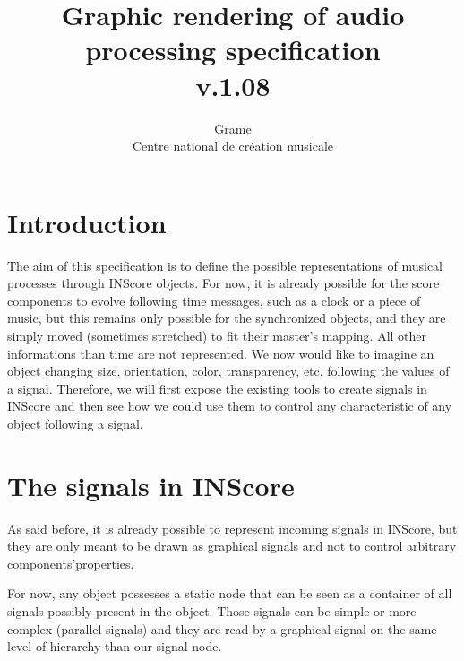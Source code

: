 \documentclass[a4paper]{article}
\begin{document}
\title{Graphic rendering of audio processing specification \\ v.1.08}

\author{Grame \\ Centre national de cr\'eation musicale}

\maketitle

\section*{Introduction}\label{sec:intro}

The aim of this specification is to define the possible representations of musical processes through INScore objects. For now, it is already possible for the score components to evolve following time messages, such as a clock or a piece of music, but this remains only possible for the synchronized objects, and they are simply moved (sometimes stretched) to fit their master's mapping. All other informations than time are not represented. We now would like to imagine an object changing size, orientation, color, transparency, etc. following the values of a signal. Therefore, we will first expose the existing tools to create signals in INScore and then see how we could use them to control any characteristic of any object following a signal.

\section{The signals in INScore}\label{sec:signals}

As said before, it is already possible to represent incoming signals in INScore, but they are only meant to be drawn as graphical signals and not to control arbitrary  components'properties.

For now, any object possesses a static node that can be seen as a container of all signals possibly present in the object. Those signals can be simple or more complex (parallel signals) and they are read by a graphical signal on the same level of hierarchy than our signal node.
\end{document}
